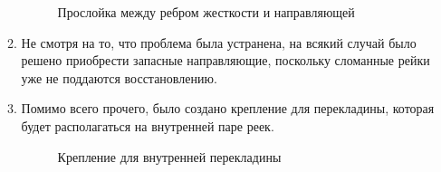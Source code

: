 \begin{enumerate}
\begin{enumerate}
      \begin{figure}[H]
      	\begin{minipage}[h]{1\linewidth}
      		\caption{Прослойка между ребром жесткости и направляющей}
      	\end{minipage}
      \end{figure}
      
      \item Не смотря на то, что проблема была устранена, на всякий случай было решено приобрести запасные направляющие, поскольку сломанные рейки уже не поддаются восстановлению.\newline
      
      \item Помимо всего прочего, было создано крепление для перекладины, которая будет располагаться на внутренней паре реек.\newline
      
      \begin{figure}[H]
      	\begin{minipage}[h]{1\linewidth}
      		\caption{Крепление для внутренней перекладины}
      	\end{minipage}
      \end{figure}
      

\end{enumerate}
\end{enumerate}
